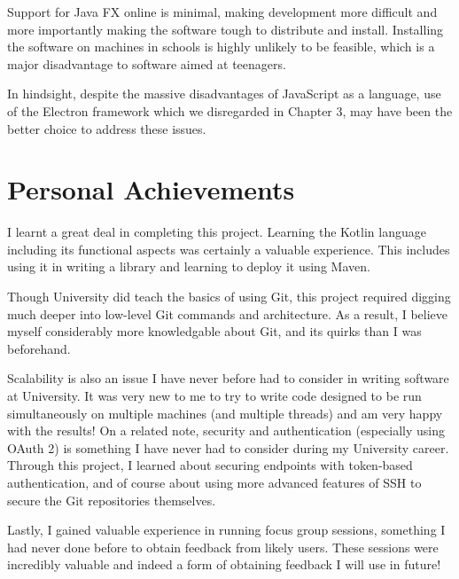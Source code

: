 Support for Java FX online is minimal, making development more difficult and more importantly making the software tough to distribute and install. Installing the software on machines in schools is highly unlikely to be feasible, which is a major disadvantage to software aimed at teenagers.

 In hindsight, despite the massive disadvantages of JavaScript as a language, use of the Electron framework which we disregarded in Chapter 3, may have been the better choice to address these issues.

\section{Personal Achievements}

I learnt a great deal in completing this project. Learning the Kotlin language including its functional aspects was certainly a valuable experience. This includes using it in writing a library and learning to deploy it using Maven.

Though University did teach the basics of using Git, this project required digging much deeper into low-level Git commands and architecture. As a result, I believe myself considerably more knowledgable about Git, and its quirks than I was beforehand. 

Scalability is also an issue I have never before had to consider in writing software at University. It was very new to me to try to write code designed to be run simultaneously on multiple machines (and multiple threads) and am very happy with the results! On a related note, security and authentication (especially using OAuth 2) is something I have never had to consider during my University career. Through this project, I learned about securing endpoints with token-based authentication, and of course about using more advanced features of SSH to secure the Git repositories themselves.

Lastly, I gained valuable experience in running focus group sessions, something I had never done before to obtain feedback from likely users. These sessions were incredibly valuable and indeed a form of obtaining feedback I will use in future!
